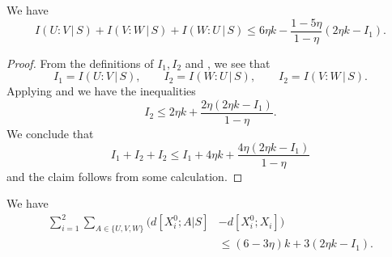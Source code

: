 \begin{lemma}\label{uvw-s}
\leanok
We have
$$
I(U : V \, | \, S) + I(V : W \, | \,S) + I(W : U \, | \, S) \leq 6 \eta k - \frac{1 - 5 \eta}{1-\eta} (2 \eta k - I_1).
$$
\end{lemma}

\begin{proof}
  \leanok
From the definitions of $I_1,I_2$ and , we see that
\[
  I_1 = I(U : V \, | \, S), \qquad I_2 = I(W : U \, | \, S), \qquad I_2 = I(V : W \, | \,S).
\]
Applying  and  we have the inequalities
\[  I_2 \leq 2 \eta k + \frac{2\eta(2 \eta k - I_1)}{1-\eta} .
\]
We conclude that
$$
   I_1 + I_2 + I_2 \leq I_1+4\eta k+ \frac{4\eta(2 \eta k - I_1)}{1-\eta}
$$
and the claim follows from some calculation.
\end{proof}

\begin{lemma}\label{total-dist}\leanok
   We have
\begin{align*}
  \sum_{i=1}^2 \sum_{A\in\{U,V,W\}} \big(d[X^0_i;A|S] & - d[X^0_i;X_i]\big) \\
    &\leq (6 - 3\eta) k + 3(2 \eta k - I_1).
\end{align*}
\end{lemma}

